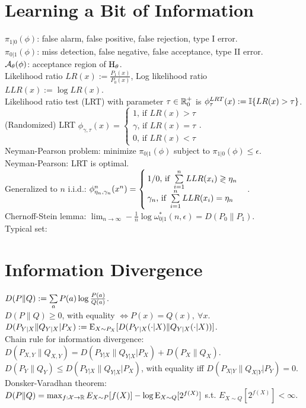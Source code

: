 \section{Learning a Bit of Information}

$\pi_{1|0}(\phi)$: false alarm, false positive, false rejection, type I error.\\
$\pi_{0|1}(\phi)$: miss detection, false negative, false acceptance, type II error.\\
$\mathcal{A}_\theta(\phi)$: acceptance region of $\mathrm{H}_\theta$.\\
Likelihood ratio $LR(x):=\frac{P_1(x)}{P_0(x)}$, Log likelihood ratio $LLR(x):=\log LR(x)$.\\
Likelihood ratio test (LRT) with parameter $\tau\in\mathbb{R}_0^+$ is $\phi^{LRT}_\tau(x):=\mathbb{I}\{LR(x)>\tau\}$.\\
(Randomized) LRT $\phi_{\gamma, \tau}(x)=\begin{cases}
1\text{, if }LR(x)>\tau\\
\gamma\text{, if }LR(x)=\tau\\
0\text{, if }LR(x)<\tau
\end{cases}$.\\
Neyman-Pearson problem: minimize $\pi_{0|1}(\phi)$ subject to $\pi_{1|0}(\phi)\leq\epsilon$.\\
Neyman-Pearson: LRT is optimal.\\
Generalized to $n$ i.i.d.: $\phi_{\eta_n, \gamma_n}^n(x^n)=\begin{cases}
1/0\text{, if }\sum\limits_{i=1}^nLLR(x_i)\gtrless\eta_n\\
\gamma_n\text{, if }\sum\limits_{i=1}^nLLR(x_i)=\eta_n
\end{cases}$.\\
Chernoff-Stein lemma: $\lim_{n\to\infty}-\frac1n\log\omega_{0|1}^*(n, \epsilon)=D(P_0\|P_1)$.\\
Typical set:

\section{Information Divergence}

$D(P\|Q):=\sum\limits_aP(a)\log\frac{P(a)}{Q(a)}$.\\
$D(P\|Q)\geq0$, with equality $\iff P(x)=Q(x),\ \forall x$.\\
$D(P_{Y|X}\|Q_{Y|X}|P_X):=\mathrm{E}_{X\sim P_X}[D(P_{Y|X}(\cdot|X)\|Q_{Y|X}(\cdot|X))]$.\\
Chain rule for information divergence: $D(P_{X, Y}\|Q_{X, Y})=D(P_{Y|X}\|Q_{Y|X}|P_X)+D(P_X\|Q_X)$.\\
$D(P_Y\|Q_Y)\leq D(P_{Y|X}\|Q_{Y|X}|P_X)$, with equality iff $D(P_{X|Y}\|Q_{X|Y}|P_Y)=0$.\\
Donsker-Varadhan theorem: $D(P\|Q)=\max_{f:\mathcal{X}\to\mathbb{R}}E_{X\sim P}[f(X)]-\log\mathrm{E}_{X\sim Q}[2^{f(X)}]$ s.t. $E_{X\sim Q}[2^{f(X)}]<\infty$.

